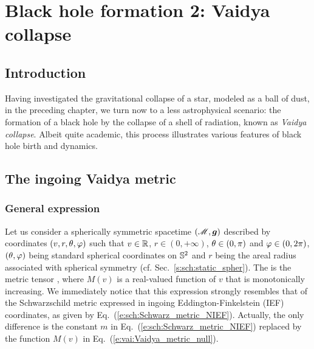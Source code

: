 \chapter{Black hole formation 2: Vaidya collapse}
\label{s:vai}

\minitoc

\section{Introduction}

Having investigated the gravitational collapse of a star, modeled as a ball of dust,
in the preceding chapter, we turn now to a less astrophysical scenario: the
formation of a black hole by the collapse of a shell of radiation,
known as \emph{Vaidya collapse}. Albeit quite
academic, this process illustrates various features of black hole birth and dynamics.

\section{The ingoing Vaidya metric}

\subsection{General expression}

Let us consider a spherically symmetric spacetime $(\mathscr{M},\bm{g})$ described by
coordinates $(v,r,\theta,\varphi)$ such that $v\in \mathbb{R}$, $r\in(0, +\infty)$,
$\theta\in(0,\pi)$ and $\varphi\in(0,2\pi)$, $(\theta,\varphi)$ being standard
spherical coordinates on $\mathbb{S}^2$ and $r$ being the areal radius associated
with spherical symmetry (cf. Sec.~\ref{s:sch:static_spher}).
The 
is the metric tensor
\be \label{e:vai:Vaidya_metric_null}
     ,
\ee
where $M(v)$ is a real-valued function of $v$ that is monotonically increasing.
We immediately notice that this expression strongly resembles that
of the Schwarzschild metric expressed in ingoing Eddington-Finkelstein (IEF)
coordinates, as given by Eq.~(\ref{e:sch:Schwarz_metric_NIEF}). Actually, the
only difference is the constant $m$ in Eq.~(\ref{e:sch:Schwarz_metric_NIEF})
replaced by the function $M(v)$ in Eq.~(\ref{e:vai:Vaidya_metric_null}).

